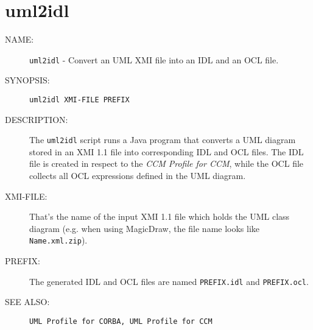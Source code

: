 \section{uml2idl}

\begin{description}

\item [NAME:] 
  {\tt uml2idl} - Convert an UML XMI file into an IDL and an OCL file. 

\item [SYNOPSIS:] 
  {\tt uml2idl XMI-FILE PREFIX}

\item [DESCRIPTION:]
  The {\tt uml2idl} script runs a Java program that converts a UML diagram stored
  in an XMI 1.1 file into corresponding IDL and OCL files.
  The IDL file is created in respect to the {\it CCM Profile for CCM}, while the
  OCL file collects all OCL expressions defined in the UML diagram.

\item [XMI-FILE:]
  That's the name of the input XMI 1.1 file which holds the UML class diagram
  (e.g. when using MagicDraw, the file name looks like {\tt Name.xml.zip}).

\item [PREFIX:]
  The generated IDL and OCL files are named {\tt PREFIX.idl} and {\tt PREFIX.ocl}.

\item [SEE ALSO:]
  {\tt UML Profile for CORBA, UML Profile for CCM}
  
\end{description}

